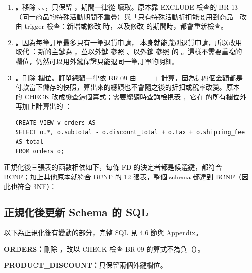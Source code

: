 \begin{enumerate}[itemsep=0.3em]
  \item \textbf{。}移除 、、，只保留 ，期間一律從  讀取。原本靠 EXCLUDE 檢查的 BR-13（同一商品的特殊活動期間不重疊）與「只有特殊活動折扣能套用到商品」改由 trigger 檢查：新增或修改  時，以及修改  的期間時，都會重新檢查。
  \item \textbf{。}因為每筆訂單最多只有一筆退貨申請， 本身就能識別退貨申請，所以改用  取代 ：新的主鍵為 ，並以外鍵  參照 、以外鍵  參照  的 。這樣不需要重複的欄位，仍然可以用外鍵保證只能退同一筆訂單的明細。
  \item \textbf{。}刪除  欄位。訂單總額一律依 BR-09 由  $-$  $+$  $+$  計算，因為這四個金額都是付款當下儲存的快照，算出來的總額也不會隨之後的折扣或稅率改變。原本  的 CHECK 改成檢查這個算式；需要總額時查詢檢視表 ，它在  的所有欄位外再加上計算出的 ：
\begin{Verbatim}[fontsize=\small,xleftmargin=2em]
CREATE VIEW v_orders AS
SELECT o.*, o.subtotal - o.discount_total + o.tax + o.shipping_fee AS total
FROM orders o;
\end{Verbatim}
\end{enumerate}

正規化後三張表的函數相依如下，每條 FD 的決定者都是候選鍵，都符合 BCNF；加上其他原本就符合 BCNF 的 12 張表，整個 schema 都達到 BCNF（因此也符合 3NF）：



\subsection{正規化後更新 Schema 的 SQL}

以下為正規化後有變動的部分，完整 SQL 見 4.6 節與 Appendix。

\textbf{ORDERS：}刪除 ，改以 CHECK 檢查 BR-09 的算式不為負（）。

\textbf{PRODUCT\_DISCOUNT：}只保留兩個外鍵欄位。

